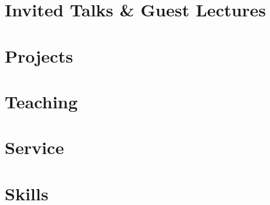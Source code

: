 \documentclass[a4paper,11pt]{article}
\begin{document}
\section{\textbf{Invited Talks \& Guest Lectures}}

{\small

}

\section{\textbf{Projects}}
{
\small

}

\section{\textbf{Teaching}}
{
\small

}


\section{\textbf{Service}}
{
\small

}




\section{\textbf{Skills}}

\end{document}
